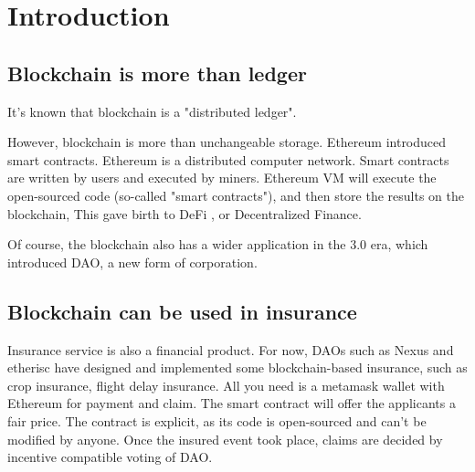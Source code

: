 \section{Introduction}

\subsection{Blockchain is more than ledger}
It's known that blockchain is a "distributed ledger".

However, blockchain is more than unchangeable storage.
Ethereum introduced smart contracts.
Ethereum is a distributed computer network.
Smart contracts are written by users and executed by miners.
Ethereum VM will execute the open-sourced code (so-called "smart contracts"), and then store the results on the blockchain,
This gave birth to DeFi \autocite{chen2020blockchain}, or Decentralized Finance.

Of course, the blockchain also has a wider application in the 3.0 era, which introduced DAO, a new form of corporation.

\subsection{Blockchain can be used in insurance}
Insurance service is also a financial product.
For now, DAOs such as Nexus and etherisc have designed and implemented some blockchain-based insurance,
such as crop insurance, flight delay insurance.
All you need is a metamask wallet with Ethereum for payment and claim.
The smart contract will offer the applicants a fair price.
The contract is explicit, as its code is open-sourced and can't be modified by anyone.
Once the insured event took place, claims are decided by incentive compatible voting of DAO.
